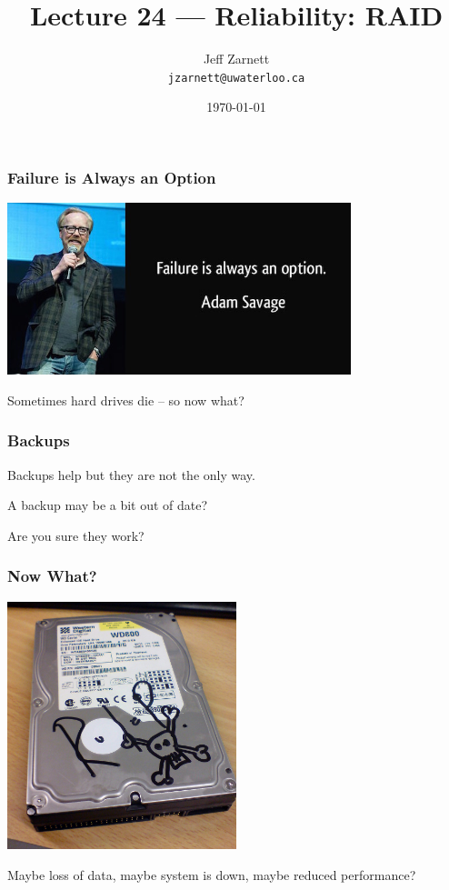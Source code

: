 

\title{Lecture 24 --- Reliability: RAID }

\author{Jeff Zarnett \\ \small \texttt{jzarnett@uwaterloo.ca}}
\date{\today}




\begin{frame}
  \titlepage

 \end{frame}


\begin{frame}
\frametitle{Failure is Always an Option}

\begin{center}
	\includegraphics[width=0.75\textwidth]{images/failure.jpg}
\end{center}

Sometimes hard drives die -- so now what?

\end{frame}


\begin{frame}
\frametitle{Backups}

Backups help but they are not the only way.

A backup may be a bit out of date?

Are you sure they work?

\end{frame}


\begin{frame}
\frametitle{Now What?}

\begin{center}
	\includegraphics[width=0.5\textwidth]{images/rip-hdd.jpg}
\end{center}

Maybe loss of data, maybe system is down, maybe reduced performance?

\end{frame}


